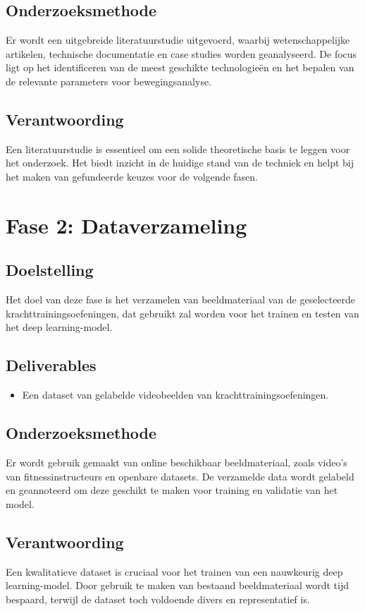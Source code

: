 \subsection{Onderzoeksmethode}
Er wordt een uitgebreide literatuurstudie uitgevoerd, waarbij wetenschappelijke artikelen, technische documentatie en case studies worden geanalyseerd. De focus ligt op het identificeren van de meest geschikte technologieën en het bepalen van de relevante parameters voor bewegingsanalyse.  

\subsection{Verantwoording}
Een literatuurstudie is essentieel om een solide theoretische basis te leggen voor het onderzoek. Het biedt inzicht in de huidige stand van de techniek en helpt bij het maken van gefundeerde keuzes voor de volgende fasen.  

\section{Fase 2: Dataverzameling}
\subsection{Doelstelling}
Het doel van deze fase is het verzamelen van beeldmateriaal van de geselecteerde krachttrainingsoefeningen, dat gebruikt zal worden voor het trainen en testen van het deep learning-model.  

\subsection{Deliverables}
\begin{itemize}
    \item Een dataset van gelabelde videobeelden van krachttrainingsoefeningen.
\end{itemize}

\subsection{Onderzoeksmethode}
Er wordt gebruik gemaakt van online beschikbaar beeldmateriaal, zoals video’s van fitnessinstructeurs en openbare datasets. De verzamelde data wordt gelabeld en geannoteerd om deze geschikt te maken voor training en validatie van het model.  

\subsection{Verantwoording}
Een kwalitatieve dataset is cruciaal voor het trainen van een nauwkeurig deep learning-model. Door gebruik te maken van bestaand beeldmateriaal wordt tijd bespaard, terwijl de dataset toch voldoende divers en representatief is.  

